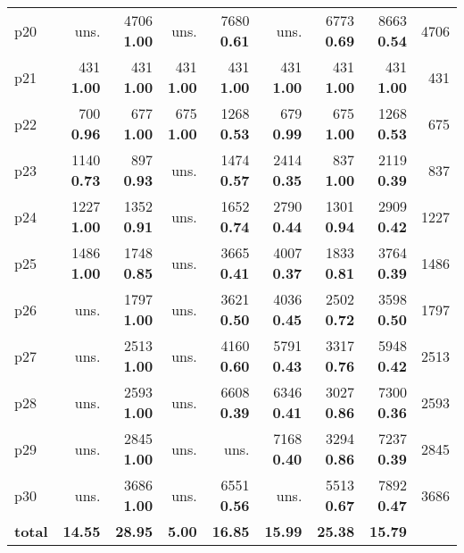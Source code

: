 \begin{tabular}{|l|rrrrrrr|r|}
p20 & uns. & {\footnotesize 4706} \textbf{1.00} & uns. & {\footnotesize 7680} \textbf{0.61} & uns. & {\footnotesize 6773} \textbf{0.69} & {\footnotesize 8663} \textbf{0.54} & 4706\\
p21 & {\footnotesize 431} \textbf{1.00} & {\footnotesize 431} \textbf{1.00} & {\footnotesize 431} \textbf{1.00} & {\footnotesize 431} \textbf{1.00} & {\footnotesize 431} \textbf{1.00} & {\footnotesize 431} \textbf{1.00} & {\footnotesize 431} \textbf{1.00} & 431\\
p22 & {\footnotesize 700} \textbf{0.96} & {\footnotesize 677} \textbf{1.00} & {\footnotesize 675} \textbf{1.00} & {\footnotesize 1268} \textbf{0.53} & {\footnotesize 679} \textbf{0.99} & {\footnotesize 675} \textbf{1.00} & {\footnotesize 1268} \textbf{0.53} & 675\\
p23 & {\footnotesize 1140} \textbf{0.73} & {\footnotesize 897} \textbf{0.93} & uns. & {\footnotesize 1474} \textbf{0.57} & {\footnotesize 2414} \textbf{0.35} & {\footnotesize 837} \textbf{1.00} & {\footnotesize 2119} \textbf{0.39} & 837\\
p24 & {\footnotesize 1227} \textbf{1.00} & {\footnotesize 1352} \textbf{0.91} & uns. & {\footnotesize 1652} \textbf{0.74} & {\footnotesize 2790} \textbf{0.44} & {\footnotesize 1301} \textbf{0.94} & {\footnotesize 2909} \textbf{0.42} & 1227\\
p25 & {\footnotesize 1486} \textbf{1.00} & {\footnotesize 1748} \textbf{0.85} & uns. & {\footnotesize 3665} \textbf{0.41} & {\footnotesize 4007} \textbf{0.37} & {\footnotesize 1833} \textbf{0.81} & {\footnotesize 3764} \textbf{0.39} & 1486\\
p26 & uns. & {\footnotesize 1797} \textbf{1.00} & uns. & {\footnotesize 3621} \textbf{0.50} & {\footnotesize 4036} \textbf{0.45} & {\footnotesize 2502} \textbf{0.72} & {\footnotesize 3598} \textbf{0.50} & 1797\\
p27 & uns. & {\footnotesize 2513} \textbf{1.00} & uns. & {\footnotesize 4160} \textbf{0.60} & {\footnotesize 5791} \textbf{0.43} & {\footnotesize 3317} \textbf{0.76} & {\footnotesize 5948} \textbf{0.42} & 2513\\
p28 & uns. & {\footnotesize 2593} \textbf{1.00} & uns. & {\footnotesize 6608} \textbf{0.39} & {\footnotesize 6346} \textbf{0.41} & {\footnotesize 3027} \textbf{0.86} & {\footnotesize 7300} \textbf{0.36} & 2593\\
p29 & uns. & {\footnotesize 2845} \textbf{1.00} & uns. & uns. & {\footnotesize 7168} \textbf{0.40} & {\footnotesize 3294} \textbf{0.86} & {\footnotesize 7237} \textbf{0.39} & 2845\\
p30 & uns. & {\footnotesize 3686} \textbf{1.00} & uns. & {\footnotesize 6551} \textbf{0.56} & uns. & {\footnotesize 5513} \textbf{0.67} & {\footnotesize 7892} \textbf{0.47} & 3686\\
\hline
\textbf{total} & \textbf{14.55} & \textbf{28.95} & \textbf{5.00} & \textbf{16.85} & \textbf{15.99} & \textbf{25.38} & \textbf{15.79} & \\
\hline
\end{tabular}

